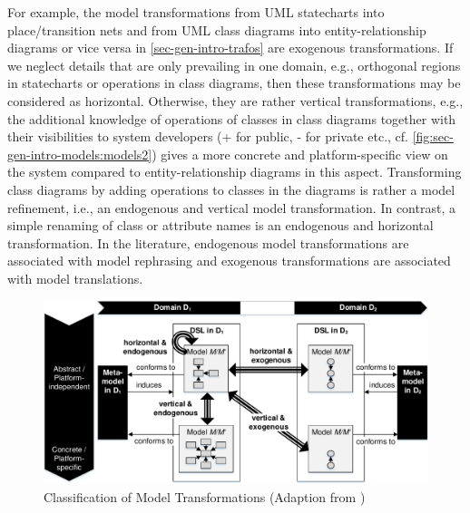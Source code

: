For example, the model transformations from UML statecharts into place/transition nets and from UML class diagrams into entity-relationship diagrams or vice versa in \cref{sec-gen-intro-trafos} are exogenous transformations.
If we neglect details that are only prevailing in one domain, e.g., orthogonal regions in statecharts or operations in class diagrams, then these transformations may be considered as horizontal.
Otherwise, they are rather vertical transformations, e.g., the additional knowledge of operations of classes in class diagrams together with their visibilities to system developers (+ for public, - for private etc., cf. \cref{fig:sec-gen-intro-models:models2}) gives a more concrete and platform-specific view on the system compared to entity-relationship diagrams in this aspect.
Transforming class diagrams by adding operations to classes in the diagrams is rather a model refinement, i.e., an endogenous and vertical model transformation.
In contrast, a simple renaming of class or attribute names is an endogenous and horizontal transformation.
In the literature, endogenous model transformations are associated with model rephrasing and exogenous transformations are associated with model translations.

\begin{figure}[!tb]
\begin{center}
\includegraphics[width=\textwidth]{img/gen_intro/mt.pdf}
\end{center}
\caption{Classification of Model Transformations (Adaption from \cite{FAGT2})}
\label{fig:sec-gen-intro-mt:mt}
\end{figure}

